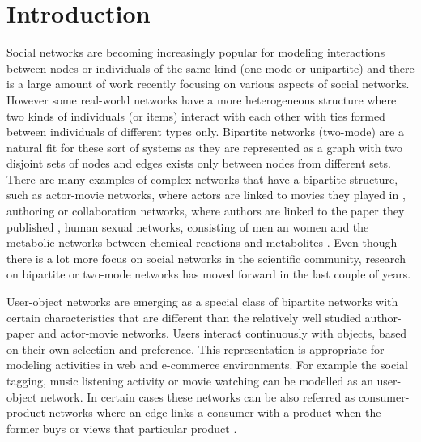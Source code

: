 
\section{Introduction}

Social networks are becoming increasingly popular for modeling interactions
between nodes or individuals of the same kind (one-mode or unipartite) and there
is a large amount of work recently focusing on various aspects of social
networks. However some real-world networks have a more heterogeneous structure
where two kinds of individuals (or items) interact with each other with ties
formed between individuals of different types only. Bipartite networks
(two-mode) are a natural fit for these sort of systems as they are represented
as a graph with two disjoint sets of nodes and edges exists only between nodes
from different sets. There are many examples of complex networks that have a
bipartite structure, such as actor-movie networks, where actors are linked to
movies they played in \citep{guillaume2004bipartite}, authoring or collaboration
networks, where authors are linked to the paper they published
\citep{newman2001scientific1}, human sexual networks, consisting of men an women
\citep{liljeros2001web} and the metabolic networks between chemical reactions
and metabolites \citep{jeong2000large}. Even though there is a lot more focus on
social networks in the scientific community, research on bipartite or two-mode
networks has moved forward in the last couple of years. 

User-object networks are emerging as a special class of bipartite networks with
certain characteristics that are different than the relatively well studied
author-paper and actor-movie networks. Users interact continuously with objects,
based on their own selection and preference. This representation is appropriate
for modeling activities in web and e-commerce environments. For example the
social tagging, music listening activity or movie watching can be modelled as an
user-object network. In certain cases these networks can be also referred as
consumer-product networks where an edge links a consumer with a product when the
former buys or views that particular product \citep{huang2007analyzing}. 

